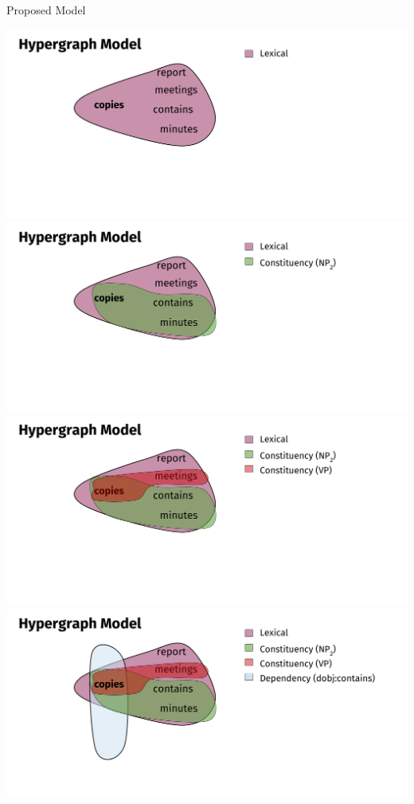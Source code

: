 \documentclass[10pt,=table]{beamer}
\begin{document}
\begin{frame}{Proposed Model}
	
	\begin{overprint}
	\includegraphics[width=1\linewidth]{image2/Chapitre2/hyper_network_ex_1.pdf}%
	\onslide<3>\includegraphics[width=1\linewidth]{image2/Chapitre2/hyper_network_ex_2.pdf}%
	\onslide<4>\includegraphics[width=1\linewidth]{image2/Chapitre2/hyper_network_ex_3.pdf}%
	\onslide<5>\includegraphics[width=1\linewidth]{image2/Chapitre2/hyper_network_ex_4.pdf}%

\end{overprint}
\end{frame}
\end{document}
